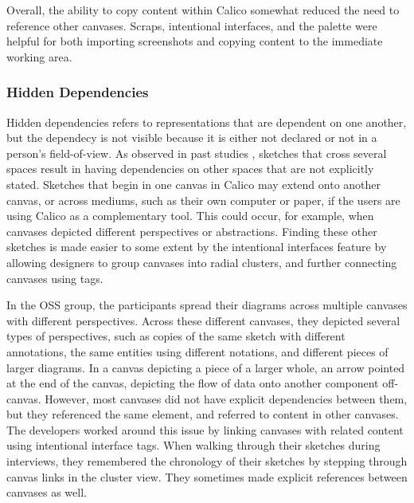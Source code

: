 Overall, the ability to copy content within Calico somewhat reduced the need to reference other canvases. Scraps, intentional interfaces, and the palette were helpful for both importing screenshots and copying content to the immediate working area.

%

\subsubsection{Hidden Dependencies}
Hidden dependencies refers to representations that are dependent on one another, but the dependecy is not visible because it is either not declared or not in a person's field-of-view. As observed in past studies \cite{dekel2007notation}, sketches that cross several spaces result in having dependencies on other spaces that are not explicitly stated. Sketches that begin in one canvas in Calico may extend onto another canvas, or across mediums, such as their own computer or paper, if the users are using Calico as a complementary tool. This could occur, for example, when canvases depicted different perspectives or abstractions. Finding these other sketches is made easier to some extent by the intentional interfaces feature by allowing designers to group canvases into radial clusters, and further connecting canvases using tags. 

In the OSS group, the participants spread their diagrams across multiple canvases with different perspectives. Across these different canvases, they depicted several types of perspectives, such as copies of the same sketch with different annotations, the same entities using different notations, and different pieces of larger diagrams. In a canvas depicting a piece of a larger whole, an arrow pointed at the end of the canvas, depicting the flow of data onto another component off-canvas. However, most canvases did not have explicit dependencies between them, but they referenced the same element, and referred to content in other canvases. The developers worked around this issue by linking canvases with related content using intentional interface tags. When walking through their sketches during interviews, they remembered the chronology of their sketches by stepping through canvas links in the cluster view. They sometimes made explicit references between canvases as well.   

